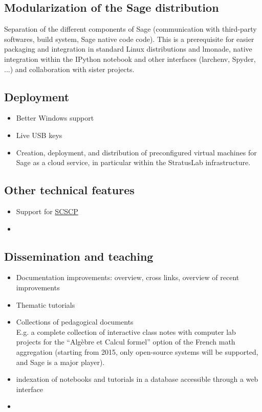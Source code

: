 \subsection{Modularization of the Sage distribution}
Separation of the different components of Sage (communication with third-party softwares, build system, Sage native code code). This is a prerequisite for easier packaging and integration in standard Linux distributions and lmonade, native integration within the IPython notebook and other interfaces (larchenv, Spyder, ...) and collaboration with sister projects.

\subsection{Deployment}
\begin{itemize}
\item Better Windows support
\item Live USB keys
\item Creation, deployment, and distribution of preconfigured virtual
machines for Sage as a cloud service, in particular within the
StratusLab infrastructure.
\end{itemize}

\subsection{Other technical features}

\begin{itemize}
\item Support for \href{http://www.symbolic-computing.org/}{SCSCP}
\item {}
\end{itemize}

\subsection{Dissemination and teaching}

\begin{itemize}
\item Documentation improvements: overview, cross links, overview of
  recent improvements
\item Thematic tutorials
\item Collections of pedagogical documents\\
  E.g. a complete collection of interactive class notes with computer
  lab projects for the ``Algèbre et Calcul formel'' option of the
  French math aggregation (starting from 2015, only open-source
  systems will be supported, and Sage is a major player).
\item indexation of notebooks and tutorials in a database accessible through a
  web interface
\item {}
\end{itemize}

